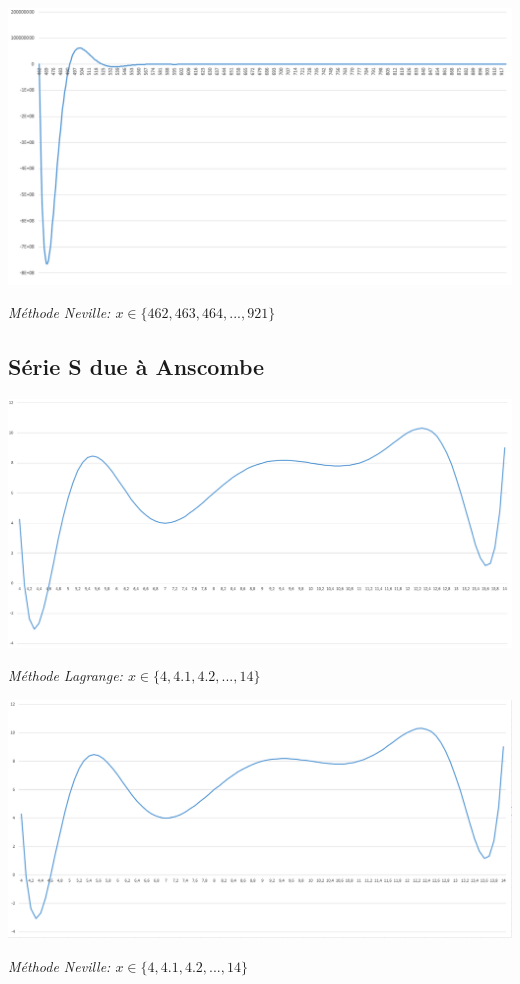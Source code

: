 \documentclass[10pt,a4paper,french]{article}
\begin{document}
\begin{center}
\includegraphics[scale=0.25]{ressources/neville_2.PNG}
\end{center}
\begin{center}
\textit{Méthode Neville: $x\in \{462,463,464,...,921\}$ }
\end{center}

\subsection{Série S due à Anscombe}

\begin{center}
\includegraphics[scale=0.25]{ressources/lagrange_3.PNG}
\end{center}
\begin{center}
\textit{Méthode Lagrange: $x\in \{4,4.1,4.2,...,14\}$ }
\end{center}

\begin{center}
\includegraphics[scale=0.25]{ressources/neville_3.PNG}
\end{center}
\begin{center}
\textit{Méthode Neville: $x\in \{4,4.1,4.2,...,14\}$ }
\end{center}
\end{document}
